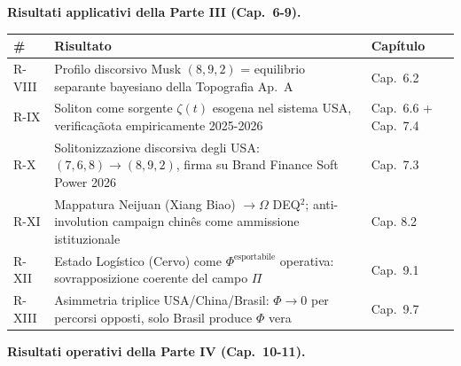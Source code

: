 \Proved{} \textbf{Risultati applicativi della Parte III (Cap.~6-9).}

{\def\LTcaptype{none} %
{\small\begin{longtable}[]{@{}
  >{\raggedright\arraybackslash}p{}
  >{\raggedright\arraybackslash}p{}
  >{\raggedright\arraybackslash}p{}@{}}
\toprule\noalign{}
\begin{minipage}[b]{\linewidth}\raggedright
\#
\end{minipage} & \begin{minipage}[b]{\linewidth}\raggedright
Risultato
\end{minipage} & \begin{minipage}[b]{\linewidth}\raggedright
Capítulo
\end{minipage} \\
\midrule\noalign{}
\endhead
\bottomrule\noalign{}
\endlastfoot
R-VIII & Profilo discorsivo Musk \((8, 9, 2)\) = equilibrio separante
bayesiano della Topografia Ap.~A & Cap.~6.2 \\
R-IX & Soliton come sorgente \(\zeta(t)\) esogena nel sistema USA,
verificaçãota empiricamente 2025-2026 & Cap.~6.6 + Cap.~7.4 \\
R-X & Solitonizzazione discorsiva degli USA: \((7,6,8) \to (8,9,2)\),
firma su Brand Finance Soft Power 2026 & Cap.~7.3 \\
R-XI & Mappatura Neijuan (Xiang Biao) \(\to \Omega\) DEQ$^2$;
anti-involution campaign chinês come ammissione istituzionale & Cap.
8.2 \\
R-XII & Estado Logístico (Cervo) come \(\Phi^{\text{esportabile}}\)
operativa: sovrapposizione coerente del campo \(\Pi\) & Cap.~9.1 \\
R-XIII & Asimmetria triplice USA/China/Brasil: \(\Phi \to 0\) per
percorsi opposti, solo Brasil produce \(\Phi\) vera & Cap.~9.7 \\
\end{longtable}}
}

\Proved{} \textbf{Risultati operativi della Parte IV (Cap.~10-11).}

